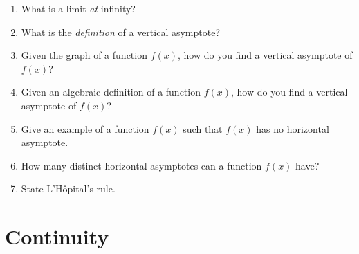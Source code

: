 \documentclass[../main.tex]{subfiles}
\begin{document}
\begin{enumerate}[label={\thesection.\arabic*.}, align=left]
  \item What is a limit \emph{at} infinity? 

  \item What is the \emph{definition} of a vertical asymptote? 

  \item Given the graph of a function \(f(x)\), how do you find a vertical asymptote of \(f(x)\)?

  \item Given an algebraic definition of a function \(f(x)\), how do you find a vertical asymptote of \(f(x)\)?

  \item Give an example of a function \(f(x)\) such that \(f(x)\) has no horizontal asymptote.

  \item How many distinct horizontal asymptotes can a function \(f(x)\) have?

  \item State L'H\^opital's rule. 
\end{enumerate}

\section{Continuity}
\end{document}
